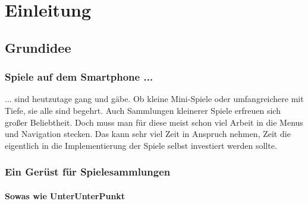 \section{Einleitung}

\subsection{Grundidee}

\subsubsection{Spiele auf dem Smartphone ...}
... sind heutzutage gang und gäbe. Ob kleine Mini-Spiele oder umfangreichere mit Tiefe, sie alle sind begehrt. Auch Sammlungen kleinerer Spiele erfreuen sich großer Beliebtheit.
Doch muss man für diese meist schon viel Arbeit in die Menus und Navigation stecken. Das kann sehr viel Zeit in Anspruch nehmen, 
Zeit die eigentlich in die Implementierung der Spiele selbst investiert werden sollte. 
\subsubsection{Ein Gerüst für Spielesammlungen}

\paragraph{Sowas wie UnterUnterPunkt}